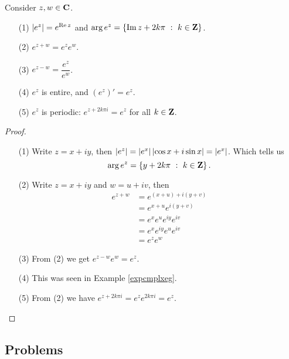 \vspace*{1em}

\begin{proposition}\label{propexp}
Consider $z,w \in \mathbf C$. 
\begin{itemize}
\item[(1)] $\left\lvert e^z\right\rvert = e^{\operatorname{Re} z}$ and $\arg e^z = \left\{\operatorname{Im} z + 2k\pi\ :\ k \in \mathbf Z\right\}$.
\item[(2)] $e^{z + w} = e^ze^w$.
\item[(3)] $e^{z - w} = \dfrac{e^z}{e^w}$.
\item[(4)] $e^z$ is entire, and $(e^z)' = e^z$.
\item[(5)] $e^z$ is periodic: $e^{z + 2k\pi i} = e^z$ for all $k \in \mathbf Z$.
\end{itemize}
\end{proposition}
\begin{proof}\hfill
\begin{itemize}
\item[(1)] Write $z = x + iy$, then $\left\lvert e^z\right\rvert = \left\lvert e^x\right\rvert\left\lvert\cos x + i\sin x\right\rvert = \left\lvert e^x\right\rvert$. Which tells us \[\arg e^z = \left\{y + 2k\pi\ :\ k \in \mathbf Z\right\}.\]
\item[(2)] Write $z = x + iy$ and $w = u + iv$, then
\begin{align*}
e^{z + w} &= e^{(x+u) + i(y + v)}\\[0.5em]
&= e^{x + u}e^{i(y + v)}\\[0.5em]
&= e^x e^u e^{iy} e^{iv}\\[0.5em]
&= e^xe^{iy}e^ue^{iv}\\[0.5em]
&= e^ze^w
\end{align*}
\item[(3)] From (2) we get $e^{z-w}e^w = e^z$.
\item[(4)] This was seen in Example \ref{expcmplxeg}.
\item[(5)] From (2) we have $e^{z + 2k\pi i} = e^z e^{2k\pi i} = e^z$.
\end{itemize}
\vspace*{-\baselineskip}
\end{proof}

\vspace*{2em}

\subsection{Problems}
\vspace{0.1in}

